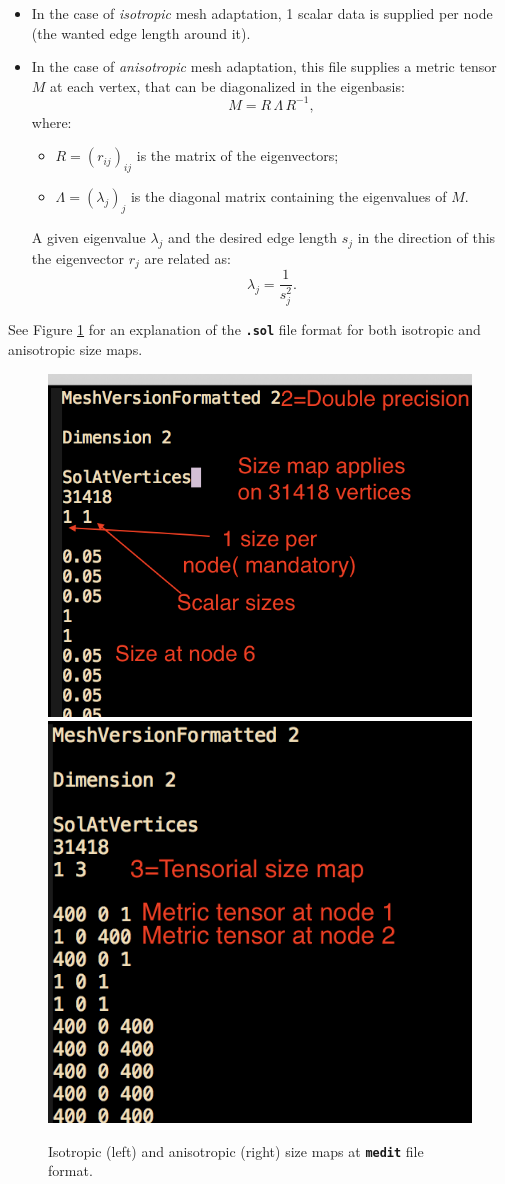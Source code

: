 \documentclass{article}
\newcommand{\ttb}[1]{\texttt{\textbf{#1}}}
\begin{document}
\begin{itemize}
\item In the case of \textit{isotropic} mesh adaptation,
1 scalar data is supplied per node (the wanted edge length around it). 
\item In the case of \textit{anisotropic} mesh adaptation, this file supplies a metric tensor $M$ at each vertex, that can be
diagonalized in the eigenbasis:
$$
M = R\, \Lambda \, R^{-1} , 
$$
where:
\begin{itemize}
\item $R = (r_{ij})_{ij}$ is the matrix of the eigenvectors;
\item $\Lambda = (\lambda_j)_j$ is the diagonal matrix containing the eigenvalues of $M$.
\end{itemize}
A given eigenvalue $\lambda_j$ and the
desired edge length $s_j$ in the direction of this the eigenvector $r_j$ are related as: 
$$\lambda_j=\frac{1}{s_j^2}.$$
\end{itemize} 

See Figure \ref{map} for an explanation of the \ttb{.sol} file format
for both isotropic and anisotropic size maps.\\

\begin{figure}
\centering
\includegraphics[width=0.4\linewidth]{iso_map}
\includegraphics[width=0.4\linewidth]{aniso_map}
\caption{\label{map}
Isotropic (left) and anisotropic (right) size maps at \ttb{medit} file format.}
\end{figure}

\begin{figure}
\centering

\end{figure}
\end{document}
